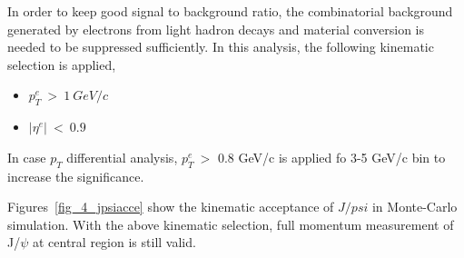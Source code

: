 In order to keep good signal to background ratio, the combinatorial background generated by electrons from light hadron decays and material conversion is needed to be suppressed sufficiently. 
In this analysis, the following kinematic selection is applied, 
\begin{itemize}
  \item $p^{e}_{T}~>~1~GeV/c$ 
  \item $|\eta^{e}|~<~0.9$
\end{itemize}
In case $p_{T}$ differential analysis, $p^{e}_{T}~>$ 0.8 GeV/c is applied fo 3-5 GeV/c bin to increase the significance. 

Figures~\ref{fig_4_jpsiacce} show the kinematic acceptance of $J/psi$ in Monte-Carlo simulation. 
With the above kinematic selection, full momentum measurement of J/$\psi$ at central region is still valid. 
